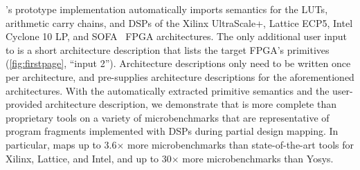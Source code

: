 \lr's prototype implementation automatically
  imports semantics for the LUTs, arithmetic carry chains,
  and DSPs of the Xilinx UltraScale+, Lattice ECP5,
  Intel Cyclone 10 LP,
  and SOFA~\cite{sofa} FPGA architectures. 
The only additional user input to \lr is a short 
  architecture description
  that lists the target FPGA's
  primitives (\cref{fig:firstpage}, ``input 2'').
Architecture descriptions
  only need to be written once per architecture,
  and \lr pre-supplies architecture descriptions
  for the aforementioned architectures.
With the automatically
  extracted primitive semantics
  and the user-provided architecture description,
  we demonstrate that \lr
  is more complete than proprietary tools on a variety
  of microbenchmarks
that are representative of program fragments
  implemented with DSPs during partial design mapping.
In particular,
  \lr maps up to 3.6$\times$ 
  more microbenchmarks than 
  state-of-the-art
  tools for Xilinx, Lattice, and Intel,
  and up to 30$\times$ 
  more microbenchmarks 
  than Yosys.

